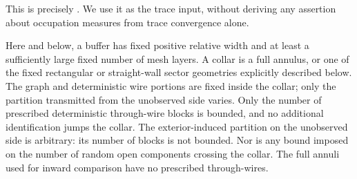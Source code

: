 This is precisely \cite[Theorem ``Dobrushin convergence for
$1\le q<4$,'' label \texttt{chordal:trace}]{FKCompanion}. We use it
as the trace input, without deriving any assertion about occupation
measures from trace convergence alone.

Here and below, a buffer has fixed positive relative width and at least
a sufficiently large fixed number of mesh layers. A collar is a full
annulus, or one of the fixed rectangular or straight-wall sector
geometries explicitly described below. The graph and deterministic
wire portions are fixed inside the collar; only the partition transmitted
from the unobserved side varies. Only the number of prescribed
deterministic through-wire blocks is bounded, and no additional
identification jumps the collar. The exterior-induced partition on
the unobserved side is arbitrary: its number of blocks is not bounded.
Nor is any bound imposed on the number of random open components
crossing the collar. The full annuli used for inward comparison have
no prescribed through-wires.

